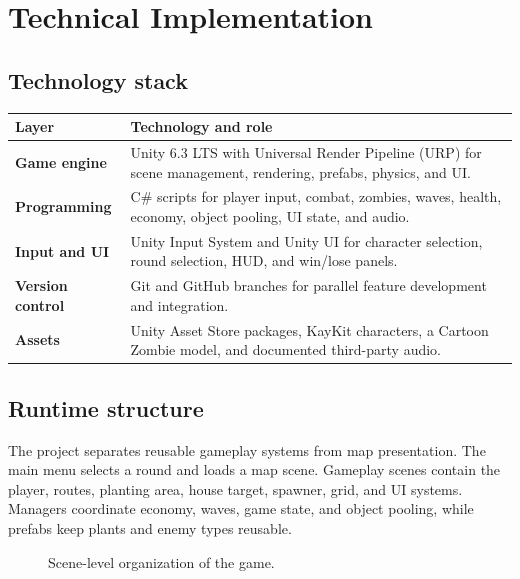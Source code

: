 \section{Technical Implementation}

\subsection{Technology stack}
\begin{tabularx}{\textwidth}{>{\bfseries}p{}X}
\toprule
Layer & Technology and role\\
\midrule
Game engine & Unity 6.3 LTS with Universal Render Pipeline (URP) for scene management, rendering, prefabs, physics, and UI.\\
Programming & C\# scripts for player input, combat, zombies, waves, health, economy, object pooling, UI state, and audio.\\
Input and UI & Unity Input System and Unity UI for character selection, round selection, HUD, and win/lose panels.\\
Version control & Git and GitHub branches for parallel feature development and integration.\\
Assets & Unity Asset Store packages, KayKit characters, a Cartoon Zombie model, and documented third-party audio.\\
\bottomrule
\end{tabularx}

\subsection{Runtime structure}
The project separates reusable gameplay systems from map presentation. The main menu selects a round and loads a map scene. Gameplay scenes contain the player, routes, planting area, house target, spawner, grid, and UI systems. Managers coordinate economy, waves, game state, and object pooling, while prefabs keep plants and enemy types reusable.

\begin{figure}[H]
\centering
{}
\caption{Scene-level organization of the game.}
\end{figure}

